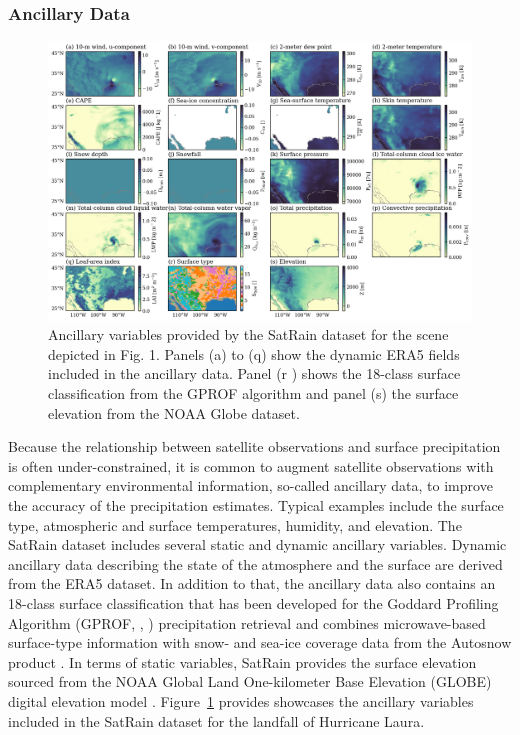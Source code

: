 \documentclass[11pt]{article}
\begin{document}
\subsubsection{Ancillary Data}

\begin{figure}[htbp] %
	\centering
	\includegraphics[width=1.0\textwidth]{figures/fig04}
	\caption{
		Ancillary variables provided by the SatRain dataset for the scene
		depicted in Fig. 1. Panels (a) to (q) show the dynamic ERA5 fields included in
		the ancillary data. Panel (r ) shows the 18-class surface classification from
		the GPROF algorithm and panel (s) the surface elevation from the NOAA Globe
		dataset.
	}
	\label{fig:ancillary_data}
\end{figure}

Because the relationship between satellite observations and surface
precipitation is often under-constrained, it is common to augment satellite
observations with complementary environmental information, so-called ancillary
data, to improve the accuracy of the precipitation estimates. Typical examples
include the surface type, atmospheric and surface temperatures, humidity, and
elevation. The SatRain dataset includes several static and dynamic ancillary
variables. Dynamic ancillary data describing the state of the atmosphere and the
surface are derived from the ERA5 \citep{Hersbach2020ERA5} dataset. In addition
to that, the ancillary data also contains an 18-class surface classification
that has been developed for the Goddard Profiling Algorithm (GPROF,
\citeauthor{GPM_GPROF_ATBD_V7}, \citeyear{GPM_GPROF_ATBD_V7}) precipitation
retrieval and combines microwave-based surface-type information with snow- and
sea-ice coverage data from the Autosnow product \citep{NCEI2025SNOWMaps}. In
terms of static variables, SatRain provides the surface elevation sourced from
the NOAA Global Land One-kilometer Base Elevation (GLOBE) digital elevation
model \citep{Hastings1999GLOBE}. Figure~\ref{fig:ancillary_data} provides
showcases the ancillary variables included in the SatRain dataset for the
landfall of Hurricane Laura.
\end{document}
